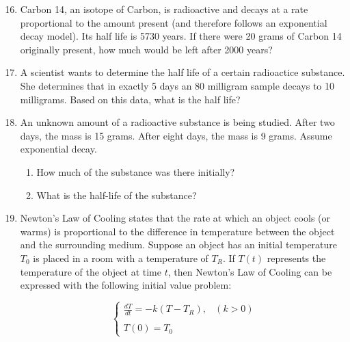 \documentclass[12pt]{article}
\newif\ifans
\begin{document}
\begin{enumerate}
\setcounter{enumi}{15}

\item Carbon 14, an isotope of Carbon, is radioactive and decays at a rate proportional to the amount present (and therefore follows an exponential decay model).  Its half life is 5730 years.  If there were 20 grams of Carbon 14 originally present, how much would be left after 2000 years?

\ifans{\fbox{$y(t)=20(2)^{-t/5730}$.  Thus, $y(2000)=20(2)^{-2000/5730}\approx 15.702$ grams.}} \fi

\item A scientist wants to determine the half life of a certain radioactice substance.  She determines that in exactly 5 days an 80 milligram sample decays to 10 milligrams.  Based on this data, what is the half life?

\ifans{\fbox{$\frac{5}{3}$}} \fi

\item An unknown amount of a radioactive substance is being studied.  After two days, the mass is 15 grams.  After eight days, the mass is 9 grams.  Assume exponential decay.

\begin{enumerate}

\item How much of the substance was there initially?

\ifans{\fbox{$y_0\approx 17.78$ grams}} \fi

\item What is the half-life of the substance?

\ifans{\fbox{$t_{1/2}=-\frac{6\ln{2}}{\ln{\left(\frac{9}{15}\right)}}\approx 8.14$ days}} \fi

\end{enumerate}

\item Newton's Law of Cooling states that the rate at which an object cools (or warms) is proportional to the difference in temperature between the object and the surrounding medium.  Suppose an object has an initial temperature $T_0$ is placed in a room with a temperature of $T_R$.  If $T(t)$ represents the temperature of the object at time $t$, then Newton's Law of Cooling can be expressed with the following initial value problem:

$$\left\{\begin{array}{ll}
\frac{dT}{dt}=-k(T-T_R), & (k >0)\\
&\\
T(0)=T_0 &
\end{array}\right.$$


\end{enumerate}
\end{document}
